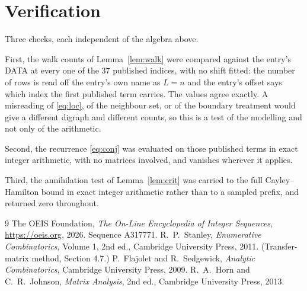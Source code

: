 \documentclass[11pt,a4paper]{article}
\theoremstyle{plain}
\theoremstyle{definition}
\begin{document}
\section{Verification}

Three checks, each independent of the algebra above.

First, the walk counts of Lemma~\ref{lem:walk} were compared against the entry's DATA at
every one of the $37$ published indices, with no shift fitted: the number of rows is
read off the entry's own name as $L=n$ and the entry's offset says which index the first
published term carries. The values agree exactly. A misreading of \eqref{eq:loc}, of the
neighbour set, or of the boundary treatment would give a different digraph and different
counts, so this is a test of the modelling and not only of the arithmetic.

Second, the recurrence \eqref{eq:conj} was evaluated on those published terms in exact
integer arithmetic, with no matrices involved, and vanishes wherever it applies.

Third, the annihilation test of Lemma~\ref{lem:crit} was carried to the full
Cayley--Hamilton bound in exact integer arithmetic rather than to a sampled prefix, and
returned zero throughout.

\begin{thebibliography}{9}
 The OEIS Foundation, \emph{The On-Line Encyclopedia of Integer
Sequences}, \url{https://oeis.org}, 2026. Sequence A317771.
 R.~P.~Stanley, \emph{Enumerative Combinatorics}, Volume 1, 2nd ed.,
Cambridge University Press, 2011. (Transfer-matrix method, Section 4.7.)
 P.~Flajolet and R.~Sedgewick, \emph{Analytic Combinatorics}, Cambridge
University Press, 2009.
 R.~A.~Horn and C.~R.~Johnson, \emph{Matrix Analysis}, 2nd ed., Cambridge
University Press, 2013.
\end{thebibliography}
\end{document}
